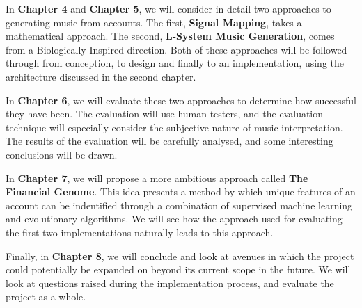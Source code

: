 In \textbf{Chapter 4} and \textbf{Chapter 5}, we will consider in detail two approaches to generating music from accounts. The first, \textbf{Signal Mapping}, takes a mathematical approach. The second, \textbf{L-System Music Generation}, comes from a Biologically-Inspired direction. Both of these approaches will be followed through from conception, to design and finally to an implementation, using the architecture discussed in the second chapter.

In \textbf{Chapter 6}, we will evaluate these two approaches to determine how successful they have been. The evaluation will use human testers, and the evaluation technique will especially consider the subjective nature of music interpretation. The results of the evaluation will be carefully analysed, and some interesting conclusions will be drawn.

In \textbf{Chapter 7}, we will propose a more ambitious approach called \textbf{The Financial Genome}. This idea presents a method by which unique features of an account can be indentified through a combination of supervised machine learning and evolutionary algorithms. We will see how the approach used for evaluating the first two implementations naturally leads to this approach.

Finally, in \textbf{Chapter 8}, we will conclude and look at avenues in which the project could potentially be expanded on beyond its current scope in the future. We will look at questions raised during the implementation process, and evaluate the project as a whole.